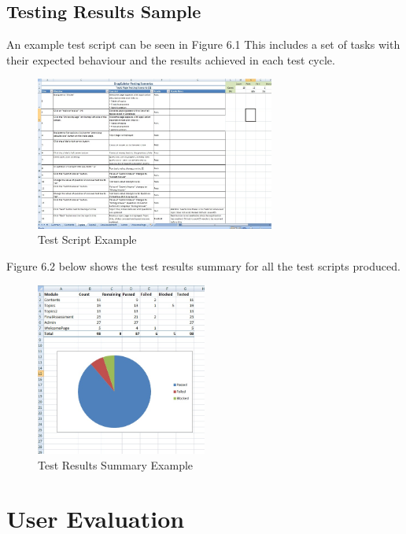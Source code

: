 \documentclass{l3proj}
\begin{document}
{%

\subsection{Testing Results Sample}

An example test script can be seen in Figure 6.1 This includes a set of tasks with their expected behaviour and the results achieved in each test cycle. 

\begin{figure}[!htb]
\caption{Test Script Example}
 \centering
\includegraphics[width=0.7\textwidth]{images/TopicTest.jpg}
\end{figure}


Figure 6.2 below shows the test results summary for all the test scripts produced. 

\begin{figure}[!htb]
\caption{Test Results Summary Example}
 \centering
\includegraphics[width=0.5\textwidth]{images/TestResultsSummary.jpg}
\end{figure}

\section{User Evaluation}

}
\end{document}
